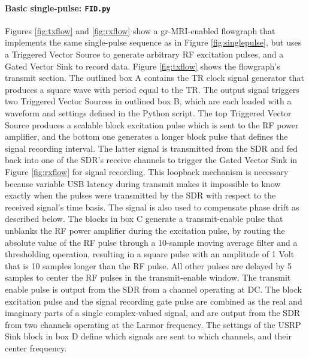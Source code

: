 \documentclass[review]{elsarticle}
\begin{document}
\paragraph{Basic single-pulse: \texttt{FID.py}} Figures \ref{fig:txflow} and \ref{fig:rxflow} show a gr-MRI-enabled 
flowgraph that implements the same single-pulse sequence as in Figure \ref{fig:singlepulse}, 
but uses a Triggered Vector Source to generate arbitrary RF excitation pulses,
and a Gated Vector Sink to record data. 
Figure \ref{fig:txflow} shows the flowgraph's transmit section.  
The outlined box A contains the TR clock signal generator that produces a square wave with period equal to the TR.  
The output signal triggers two Triggered Vector Sources in outlined box B, 
which are each loaded with a waveform and settings defined in the 
Python script.
The top Triggered Vector Source produces a scalable block excitation pulse which is sent to the RF power amplifier, 
and the bottom one generates a longer block pulse that defines the signal recording interval.  
The latter signal is transmitted from the SDR and fed back into one of the SDR's receive channels to trigger the Gated Vector Sink in Figure \ref{fig:rxflow} for signal recording.  
This loopback mechanism is necessary because variable USB latency during transmit makes it impossible to know exactly when 
the pulses were transmitted by the SDR with respect to the received signal's time basis.
The signal is also used to compensate phase drift as described below.
The blocks in box C generate a transmit-enable pulse that unblanks the RF power amplifier during the excitation pulse,
by routing the absolute value of the RF pulse through a 10-sample moving average filter and a thresholding operation, 
resulting in a square pulse with an amplitude of 1 Volt that is 10 samples longer than the RF pulse. 
All other pulses are delayed by 5 samples to center the RF pulses in the transmit-enable window.
The transmit enable pulse is output from the SDR from a channel operating at DC.  
The block excitation pulse and the signal recording gate pulse are combined as the real and imaginary parts of 
a single complex-valued signal, and are output from the SDR from two channels operating at the Larmor frequency.
The settings of the USRP Sink block in box D define which signals are sent to which channels, and their center frequency.
\end{document}
